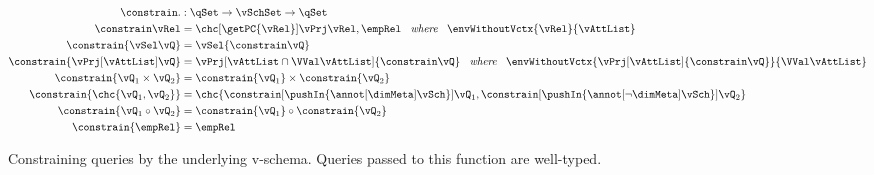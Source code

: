 \begin{figure}
\begin{alignat*}{1}
\constrain . &: \qSet \to \vSchSet \to \qSet\\
%
\constrain \vRel &= 
\chc [\getPC {\vRel}] {\vPrj \vRel, \empRel}
\hspace{5pt} \textit{ where } \hspace{5pt}
\envWithoutVctx   {\vRel} {\vAttList}
\\
\constrain {\vSel \vQ}  &=  \vSel {\constrain \vQ}
\\
%
\constrain {\vPrj [\vAttList] \vQ} &= 
\vPrj [\vAttList \cap \VVal \vAttList] {\constrain \vQ}
\hspace{5pt} \textit{ where } \hspace{5pt}
\envWithoutVctx {\vPrj [\vAttList] {\constrain \vQ}} {\VVal \vAttList}
\\
%
\constrain {{\vQ_1} \times {\vQ_2}} &= 
\constrain {\vQ_1} \times \constrain {\vQ_2}
\\
%
%
\constrain {\chc {\vQ_1, \vQ_2}} &= 
\chc {\constrain [\pushIn {\annot [\dimMeta] \vSch}] {\vQ_1}, \constrain [\pushIn {\annot [\neg \dimMeta] \vSch}] {\vQ_2}}
\\
%
\constrain {{\vQ_1} \circ {\vQ_2}} &= 
\constrain {\vQ_1} \circ \constrain {\vQ_2}\\
%
\constrain {\empRel} &= \empRel
\end{alignat*}
\caption{
Constraining queries by the underlying v-schema. Queries passed to this 
function are well-typed.
}
\label{fig:constrain}
\end{figure}
